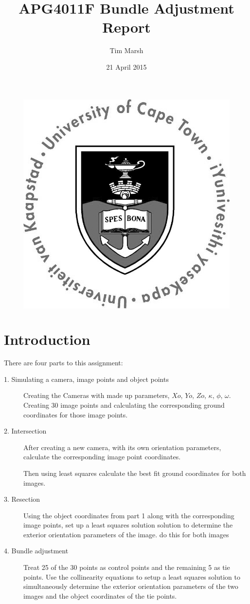 \documentclass[12pt,a4paper]{article}
\title{APG4011F Bundle Adjustment Report}
\date{21 April 2015}
\author{Tim Marsh}
\begin{document}
	
	\maketitle
	\begin{figure}[H]
		\centering
		\includegraphics[width=0.7\linewidth]{images/UCTcircular_logo1_CMYK}
		\label{fig:UCTcircular_logo1_CMYK}
	\end{figure}
	\newpage
	\tableofcontents
	\listoffigures
	\newpage
	
	
	\section{Introduction}
	
	There are four parts to this assignment:
	
	\begin{description}
			\item[1. Simulating a camera, image points and object points] Creating the Cameras with made up parameters, $Xo$, $Yo$, $Zo$, $\kappa$, $\phi$, $\omega$. Creating 30 image points and calculating the corresponding ground coordinates for those image points.
			
			\item[2. Intersection] After creating a new camera, with its own orientation parameters, calculate the corresponding image point coordinates.
			
			Then using least squares calculate the best fit ground coordinates for both images.
			
			\item[3. Resection] Using the object coordinates from part 1 along with the corresponding image points, set up a least squares solution solution to determine the exterior orientation parameters of the image. do this for both images
			
			\item[4. Bundle adjustment] Treat 25 of the 30 points as control points and the remaining 5 as tie points. Use the collinearity equations to setup a least squares solution to simultaneously determine the exterior orientation parameters of the two images and the object coordinates of the tie points.
			
	\end{description}
	
\end{document}
